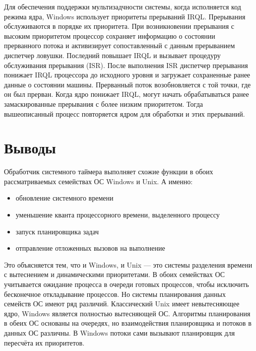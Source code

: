 Для обеспечения поддержки мультизадчности системы, когда исполняется код режима ядра, Windows использует приоритеты прерываний IRQL. Прерывания обслуживаются в порядке их приоритета. При возникновении прерывания с высоким приоритетом процессор сохраняет информацию о состоянии прерванного потока и активизирует сопоставленный с данным прерыванием диспетчер ловушки. Последний повышает IRQL и вызывает процедуру обслуживания прерывания (ISR). После выполнения ISR диспетчер прерывания понижает IRQL процессора до исходного уровня и загружает сохраненные ранее данные о состоянии машины. Прерванный поток возобновляется с той точки, где он был прерван. Когда ядро понижает IRQL, могут начать обрабатываться ранее замаскированные прерывания с более низким приоритетом. Тогда вышеописанный процесс повторяется ядром для обработки и этих прерываний.

\chapter{Выводы}
Обработчик системного таймера выполняет схожие функции в обоих рассматриваемых семействах ОС Windows и Unix. А именно:
\begin{itemize}
	\item обновление системного времени
	\item уменьшение кванта процессорного времени, выделенного процессу
	\item запуск планировщика задач
	\item отправление отложенных вызовов на выполнение
\end{itemize}

Это объясняется тем, что и Windows, и Unix — это системы разделения времени с вытеснением и динамическими приоритетами. В обоих семействах ОС учитывается ожидание процесса в очереди готовых процессов, чтобы исключить бесконечное откладывание процессов. Но системы планирования данных семейств ОС имеют ряд различий. Классический Unix имеет невытесняющее ядро, Windows является полностью вытесняющей ОС. Алгоритмы планирования в обеих ОС основаны на очередях, но взаимодействия планировщика и потоков в данных ОС различны. В Windows потоки сами вызывают планировщик для пересчёта их приоритетов.